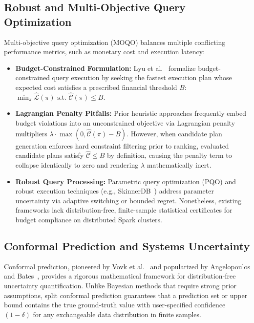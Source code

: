 \subsection{Robust and Multi-Objective Query Optimization}
Multi-objective query optimization (MOQO) balances multiple conflicting performance metrics, such as monetary cost and execution latency:
\begin{itemize}
    \item \textbf{Budget-Constrained Formulation:} Lyu et al.~\cite{lyu2018multiobjective} formalize budget-constrained query execution by seeking the fastest execution plan whose expected cost satisfies a prescribed financial threshold $B$: $\min_{\pi} \hat{\mathcal{L}}(\pi) \text{ s.t. } \hat{\mathcal{C}}(\pi) \le B$.
    \item \textbf{Lagrangian Penalty Pitfalls:} Prior heuristic approaches frequently embed budget violations into an unconstrained objective via Lagrangian penalty multipliers $\lambda \cdot \max(0, \hat{\mathcal{C}}(\pi) - B)$. However, when candidate plan generation enforces hard constraint filtering prior to ranking, evaluated candidate plans satisfy $\hat{\mathcal{C}} \le B$ by definition, causing the penalty term to collapse identically to zero and rendering $\lambda$ mathematically inert.
    \item \textbf{Robust Query Processing:} Parametric query optimization (PQO) and robust execution techniques (e.g., SkinnerDB~\cite{trummer2019skinnerdb}) address parameter uncertainty via adaptive switching or bounded regret. Nonetheless, existing frameworks lack distribution-free, finite-sample statistical certificates for budget compliance on distributed Spark clusters.
\end{itemize}

\subsection{Conformal Prediction and Systems Uncertainty}
Conformal prediction, pioneered by Vovk et al.~\cite{vovk2005algorithmic} and popularized by Angelopoulos and Bates~\cite{angelopoulos2021gentle}, provides a rigorous mathematical framework for distribution-free uncertainty quantification. Unlike Bayesian methods that require strong prior assumptions, split conformal prediction guarantees that a prediction set or upper bound contains the true ground-truth value with user-specified confidence $(1 - \delta)$ for any exchangeable data distribution in finite samples. 

